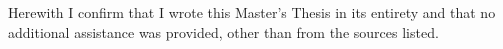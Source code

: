 \documentclass[
12pt, %
english, %
onehalfspacing, %
headsepline, %
]{MastersDoctoralThesis} %
\begin{document}

%
%
%

\begin{Literature}
\addchaptertocentry{\literaturename} 
\nocite{apsrev41Control}

\end{Literature}

\begin{statement}
\addchaptertocentry{\statementname}
\vspace{10pt}
Herewith I confirm that I wrote this Master's Thesis in its entirety and that no additional assistance was provided, other than from the sources listed.
\end{statement}
\end{document}
